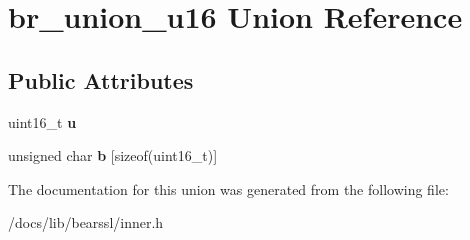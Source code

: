 \hypertarget{unionbr__union__u16}{}\section{br\+\_\+union\+\_\+u16 Union Reference}
\label{unionbr__union__u16}
\subsection*{Public Attributes}
\begin{DoxyCompactItemize}
\item 
\mbox{\label{unionbr__union__u16_abfc629d1372cd1364922319f5dde167e}} 
uint16\+\_\+t {\bfseries u}
\item 
\mbox{\label{unionbr__union__u16_a41e4316c0487dd01cf0dec91acfc13d3}} 
unsigned char {\bfseries b} \mbox{[}sizeof(uint16\+\_\+t)\mbox{]}
\end{DoxyCompactItemize}


The documentation for this union was generated from the following file\+:\begin{DoxyCompactItemize}
\item 
/docs/lib/bearssl/inner.\+h\end{DoxyCompactItemize}
